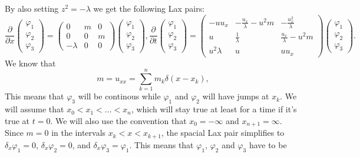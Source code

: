 \documentclass[english,master]{liumaiex}
\theoremstyle{plain}
\theoremstyle{definition}
\begin{document}
By also setting $z^2 = -\lambda$ we get the following Lax pairs:
\begin{subequations}
\begin{equation}
\frac{\partial}{\partial x}
\begin{pmatrix} \varphi_1 \\ \varphi_2 \\ \varphi_3 \end{pmatrix} =
\begin{pmatrix}
	0 & m & 0 \\
	0 & 0 & m \\
	-\lambda & 0 & 0
\end{pmatrix}
\begin{pmatrix} \varphi_1 \\ \varphi_2 \\ \varphi_3 \end{pmatrix}
,
\end{equation}
\begin{equation}
\frac{\partial}{\partial t}
\begin{pmatrix} \varphi_1 \\ \varphi_2 \\ \varphi_3 \end{pmatrix} =
\begin{pmatrix}
	-u u_x & -\frac{u_x}{\lambda}-u^2 m & -\frac{u_x^2}{\lambda} \\
	u & \frac{1}{\lambda} & \frac{u_x}{\lambda} - u^2 m \\
	u^2\lambda & u & uu_x
\end{pmatrix}
\begin{pmatrix} \varphi_1 \\ \varphi_2 \\ \varphi_3 \end{pmatrix}
.
\end{equation}
\end{subequations}
%
%
We know that
\begin{equation}
	m = u_{xx} = \sum_{k=1}^n m_k \delta(x - x_k),
\end{equation}
This means that $\varphi_3$ will be continous while $\varphi_1$ and $\varphi_2$ will have jumps at $x_k$.
We will assume that $x_0 < x_1 < ... < x_n$, which will stay true at least for a time if it's true at $t = 0$. We will also use the convention that $x_0 = -\infty$ and $x_{n+1} = \infty$. Since $m = 0$ in the intervals $x_k < x < x_{k+1}$, the spacial Lax pair simplifies to $\delta_x \varphi_1 = 0$, $\delta_x \varphi_2 = 0$, and $\delta_x \varphi_3 = \varphi_1$. This means that $\varphi_1$, $\varphi_2$ and $\varphi_3$ have to be
\end{document}
